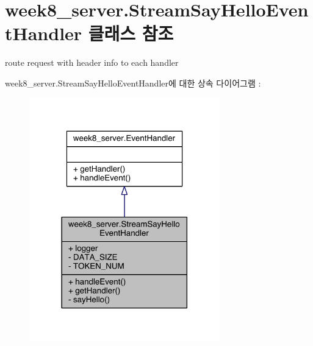 \hypertarget{classweek8__server_1_1_stream_say_hello_event_handler}{\section{week8\-\_\-server.\-Stream\-Say\-Hello\-Event\-Handler 클래스 참조}
\label{classweek8__server_1_1_stream_say_hello_event_handler}
}


route request with header info to each handler  




week8\-\_\-server.\-Stream\-Say\-Hello\-Event\-Handler에 대한 상속 다이어그램 \-: 
\nopagebreak
\begin{figure}[H]
\begin{center}
\leavevmode
\includegraphics[width=234pt]{classweek8__server_1_1_stream_say_hello_event_handler__inherit__graph}
\end{center}
\end{figure}


